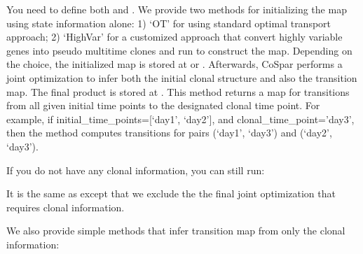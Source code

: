 \documentclass[letterpaper,10pt,english]{sphinxmanual}
\begin{document}
You need to define both  and . We provide two methods for initializing the map using state information alone: 1) ‘OT’ for using standard optimal transport approach; 2) ‘HighVar’ for a customized approach that convert highly variable genes into pseudo multi\sphinxhyphen{}time clones and run  to construct the map. Depending on the choice,  the initialized map is stored at  or  . Afterwards, CoSpar performs a joint optimization to infer both the initial clonal structure and also the transition map. The final product is stored at . This method returns a map for transitions from all given initial time points to the designated clonal time point.  For example, if initial\_time\_points={[}‘day1’, ‘day2’{]}, and clonal\_time\_point=’day3’, then the method computes transitions for pairs (‘day1’, ‘day3’) and (‘day2’, ‘day3’).

If you do not have any clonal information, you can still run:

\begin{sphinxVerbatim}[commandchars=\\\{\}]
\end{sphinxVerbatim}

It is the same as  except that we exclude the the final joint optimization that requires clonal information.

We also provide simple methods that infer transition map from only the clonal information:

\begin{sphinxVerbatim}[commandchars=\\\{\}]
\end{sphinxVerbatim}
\end{document}
